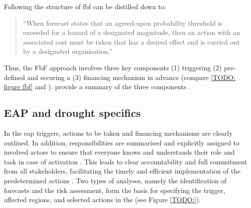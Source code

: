 
Following \autocite{coughlandeperezForecastbasedFinancingApproach2015, coughlandeperezActionbasedFloodForecasting2016} the structure of \acrshort{fbf} can be distilled down to:
\begin{quote}
    “When forecast states that an agreed-upon probability threshold is exceeded for a hazard of a designated magnitude, then an action with an associated cost must be taken that has a desired effect and is carried out by a designated organisation.” \autocite[2]{coughlandeperezActionbasedFloodForecasting2016}
\end{quote}

Thus, the FbF approach involves three key components (1) triggering (2) pre-defined  and securing a (3) financing mechanism in advance (compare \ref{TODO: figure fbf} and \autocite{ifrcForecastbasedFinancingNew2019}).  provide a summary of the three components \autocite{ruthForecastbasedFinancingPolicy2017}.



\subsection{EAP and drought specifics}\label{subsec:eap}

In the \acrfull{eap} triggers, actions to be taken and financing mechanisms are clearly outlined. In addition, responsibilities are summarised and explicitly assigned to involved actors to ensure that everyone knows and understands their role and task in case of activation \autocite{ruthForecastbasedFinancingPolicy2017}. This leads to clear accountability and full commitment from all stakeholders, facilitating the timely and efficient implementation of the predetermined actions \autocite{ruthForecastbasedFinancingPolicy2017}.\newline
Two types of analyses, namely the identification of forecasts and the risk assessment, form the basis for specifying the trigger, affected regions, and selected actions in the  (see Figure \ref{TODO:}). 


